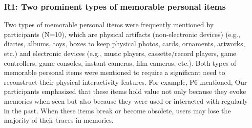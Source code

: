\subsubsection{R1: Two prominent types of memorable personal items}
Two types of memorable personal items were frequently mentioned by participants (N=10), which are physical artifacts (non-electronic devices) (e.g., diaries, albums, toys, boxes to keep physical photos, cards, ornaments, artworks, etc.) and electronic devices (e.g., music players, cassette/record players, game controllers, game consoles, instant cameras, film cameras, etc.). 
Both types of memorable personal items were mentioned to require a significant need to reconstruct their physical interactivity features.
For example, P6 mentioned, 
Our participants emphasized that these items hold value not only because they evoke memories when seen but also because they were used or interacted with regularly in the past.
When these items break or become obsolete, users may lose the majority of their traces in memories.  







